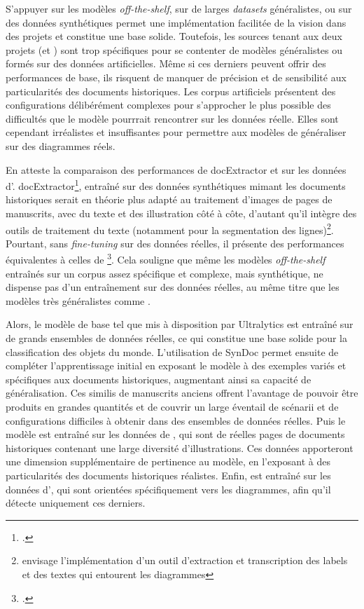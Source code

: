 S'appuyer sur les modèles \textit{off-the-shelf}, sur de larges \textit{datasets}
généralistes, ou sur des données synthétiques permet une implémentation
facilitée de la vision dans des projets et constitue une base solide.
Toutefois, les sources tenant aux deux projets (\vhs et \eida) sont trop
spécifiques pour se contenter de modèles généralistes ou formés sur des
données artificielles. Même si ces derniers peuvent offrir des performances
de base, ils risquent de manquer de précision et de sensibilité aux
particularités des documents historiques. Les corpus artificiels
présentent des configurations délibérément complexes pour s'approcher le
plus possible des difficultés que le modèle pourrrait rencontrer sur les
données réelle. Elles sont cependant irréalistes et insuffisantes pour
permettre aux modèles de généraliser sur des diagrammes réels.

En atteste la comparaison des performances de docExtractor et \yolov sur
les données d'\eida. docExtractor\footcite{monnier_docextractor_2020}, entraîné
sur des données synthétiques mimant les documents historiques serait en
théorie plus adapté au traitement d'images de pages de manuscrits, avec
du texte et des illustration côté à côte, d'autant qu'il intègre des
outils de traitement du texte (notamment pour la segmentation des
lignes)\footnote{\eida envisage l'implémentation d'un outil d'extraction
  et transcription des labels et des textes qui entourent les diagrammes}.
Pourtant, sans \textit{fine-tuning} sur des données réelles, il présente des
performances équivalentes à celles de \yolov\footcite[p.45]{norindr_traitement_2023}. Cela
souligne que même les modèles \textit{off-the-shelf} entraînés sur un corpus
assez spécifique et complexe, mais synthétique, ne dispense pas d'un
entraînement sur des données réelles, au même titre que les modèles très
généralistes comme \yolov.

Alors, le modèle de base \yolov tel que mis à disposition par
Ultralytics est entraîné sur de grands ensembles de données réelles, ce
qui constitue une base solide pour la classification des objets du
monde. L'utilisation de SynDoc permet ensuite de compléter
l'apprentissage initial en exposant le modèle à des exemples variés et
spécifiques aux documents historiques, augmentant ainsi sa capacité de
généralisation. Ces similis de manuscrits anciens offrent l'avantage de
pouvoir être produits en grandes quantités et de couvrir un large
éventail de scénarii et de configurations difficiles à obtenir dans des
ensembles de données réelles. Puis le modèle est entraîné sur les
données de \vhs, qui sont de réelles pages de documents historiques
contenant une large diversité d'illustrations. Ces données apporteront
une dimension supplémentaire de pertinence au modèle, en l'exposant à
des particularités des documents historiques réalistes. Enfin, \yolov
est entraîné sur les données d'\eida, qui sont orientées spécifiquement
vers les diagrammes, afin qu'il détecte uniquement ces derniers.

